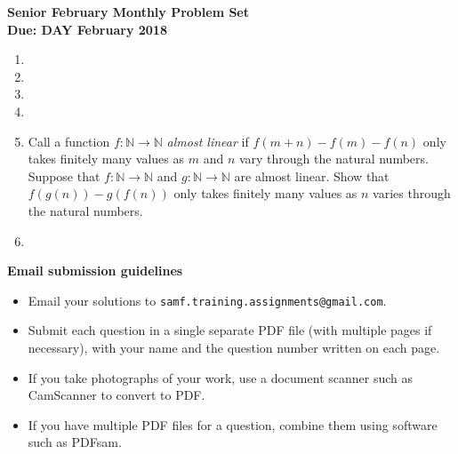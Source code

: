 \documentclass{article}
\begin{document}
\begin{center}
\textbf{\Large Senior February Monthly Problem Set}
\\ \vspace{1em}
\textbf{\large Due: DAY February 2018}
\end{center}

\begin{enumerate}[1.]

\item


\vspace{6pt}
\item


\vspace{6pt}
\item


\vspace{6pt}
\item


\vspace{6pt}
\item
Call a function $f : \mathbb{N} \to \mathbb{N}$ \emph{almost linear} if $f(m + n) - f(m) - f(n)$ only takes finitely many values as $m$ and $n$ vary through the natural numbers. Suppose that $f : \mathbb{N} \to \mathbb{N}$ and $g : \mathbb{N} \to \mathbb{N}$ are almost linear. Show that $f(g(n)) - g(f(n))$ only takes finitely many values as $n$ varies through the natural numbers.


\vspace{6pt}
\item


\end{enumerate}

\vfill
\textbf{\Large Email submission guidelines}
\begin{itemize}
	\item Email your solutions to \verb!samf.training.assignments@gmail.com!.
	\item Submit each question in a single separate PDF file (with multiple pages if necessary), with your name and the question number written on each page.
	\item If you take photographs of your work, use a document scanner such as CamScanner to convert to PDF.
	\item If you have multiple PDF files for a question, combine them using software such as PDFsam.
\end{itemize}
\end{document}
